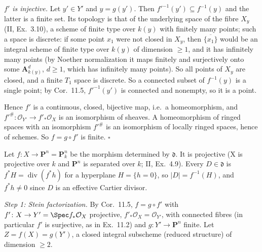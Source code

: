 \documentclass[11pt]{article}
\begin{document}
\emph{$f'$ is injective.} Let $y'\in Y'$ and $y=g(y')$. Then $f'^{-1}(y')\subseteq f^{-1}(y)$ and the latter is a finite set. Its topology is that of the underlying space of the fibre $X_y$ (II, Ex.~3.10), a scheme of finite type over $k(y)$ with finitely many points; such a space is discrete: if some point $x_1$ were not closed in $X_y$, then $\overline{\{x_1\}}$ would be an integral scheme of finite type over $k(y)$ of dimension $\ge1$, and it has infinitely many points (by Noether normalization it maps finitely and surjectively onto some $\mathbf A^d_{k(y)}$, $d\ge1$, which has infinitely many points). So all points of $X_y$ are closed, and a finite $T_1$ space is discrete. So a connected subset of $f^{-1}(y)$ is a single point; by Cor.~11.5, $f'^{-1}(y')$ is connected and nonempty, so it is a point.

Hence $f'$ is a continuous, closed, bijective map, i.e.\ a homeomorphism, and $f'^\#\colon\mathcal O_{Y'}\to f'_*\mathcal O_X$ is an isomorphism of sheaves. A homeomorphism of ringed spaces with an isomorphism $f'^\#$ is an isomorphism of locally ringed spaces, hence of schemes. So $f=g\circ f'$ is finite. \hfill$\square$

\pf
Let $f\colon X\to\mathbf P^n=\mathbf P^n_k$ be the morphism determined by $\mathfrak d$. It is projective (X is projective over $k$ and $\mathbf P^n$ is separated over $k$; II, Ex.~4.9). Every $D\in\mathfrak d$ is $f^*H=\operatorname{div}(f^*h)$ for a hyperplane $H=\{h=0\}$, so $|D|=f^{-1}(H)$, and $f^*h\neq0$ since $D$ is an effective Cartier divisor.

\emph{Step 1: Stein factorization.} By Cor.~11.5, $f=g\circ f'$ with $f'\colon X\to Y'=\Spec f_*\mathcal O_X$ projective, $f'_*\mathcal O_X=\mathcal O_{Y'}$, with connected fibres (in particular $f'$ is surjective, as in Ex.~11.2) and $g\colon Y'\to\mathbf P^n$ finite. Let $Z=f(X)=g(Y')$, a closed integral subscheme (reduced structure) of dimension $\ge2$.
\end{document}
